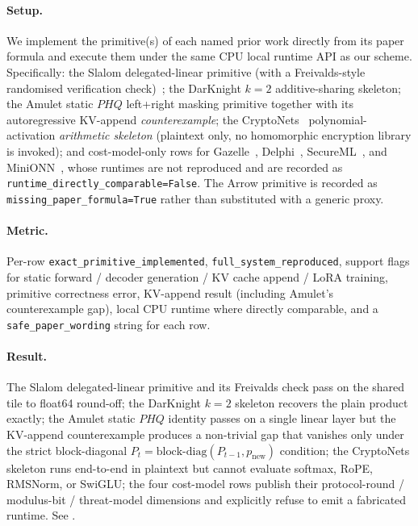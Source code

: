 \paragraph{Setup.} We implement the primitive(s) of each named prior work directly from its paper formula and execute them under the same CPU local runtime API as our scheme. Specifically: the Slalom delegated-linear primitive (with a Freivalds-style randomised verification check)~\cite{tramer2019slalom}; the DarKnight $k=2$ additive-sharing skeleton; the Amulet static $P H Q$ left+right masking primitive together with its autoregressive KV-append \emph{counterexample}; the CryptoNets~\cite{dowlin2016cryptonets} polynomial-activation \emph{arithmetic skeleton} (plaintext only, no homomorphic encryption library is invoked); and cost-model-only rows for Gazelle~\cite{juvekar2018gazelle}, Delphi~\cite{mishra2020delphi}, SecureML~\cite{mohassel2017secureml}, and MiniONN~\cite{liu2017minionn}, whose runtimes are not reproduced and are recorded as \texttt{runtime\_directly\_comparable=False}. The Arrow primitive is recorded as \texttt{missing\_paper\_formula=True} rather than substituted with a generic proxy.

\paragraph{Metric.} Per-row \texttt{exact\_primitive\_implemented}, \texttt{full\_system\_reproduced}, support flags for static forward / decoder generation / KV cache append / LoRA training, primitive correctness error, KV-append result (including Amulet's counterexample gap), local CPU runtime where directly comparable, and a \texttt{safe\_paper\_wording} string for each row.

\paragraph{Result.} The Slalom delegated-linear primitive and its Freivalds check pass on the shared tile to float64 round-off; the DarKnight $k=2$ skeleton recovers the plain product exactly; the Amulet static $P H Q$ identity passes on a single linear layer but the KV-append counterexample produces a non-trivial gap that vanishes only under the strict block-diagonal $P_t = \mathrm{block\text{-}diag}(P_{t-1}, p_{\mathrm{new}})$ condition; the CryptoNets skeleton runs end-to-end in plaintext but cannot evaluate softmax, RoPE, RMSNorm, or SwiGLU; the four cost-model rows publish their protocol-round / modulus-bit / threat-model dimensions and explicitly refuse to emit a fabricated runtime. See .

